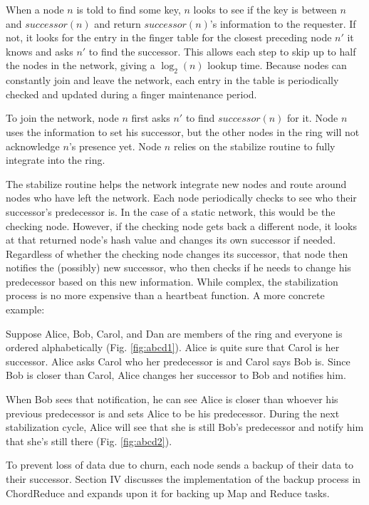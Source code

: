 When a node $n$ is told to find some key, $n$ looks to see if the key is between $n$ and $successor(n)$ and return $successor(n)$'s information to the requester. If not, it looks for the entry in the finger table for the closest preceding node $n'$ it knows and asks $n'$ to find the successor.  This allows each step to skip up to half the nodes in the network, giving a $\log_2(n)$ lookup time.  Because nodes can constantly join and leave the network, each entry in the table is periodically checked and updated during a finger maintenance period. 

To join the network, node $n$ first asks $n'$ to find $successor(n)$ for it.  Node $n$ uses the information to set his successor, but the other nodes in the ring will not acknowledge $n$'s presence yet.  Node $n$ relies on the stabilize routine to fully integrate into the ring.

The stabilize routine helps the network integrate new nodes and route around nodes who have left the network. Each node periodically checks to see who their successor's predecessor is.  In the case of a static network, this would be the checking node.  However, if the checking node gets back a different node, it looks at that returned node's hash value and changes its own successor if needed.  Regardless of whether the checking node changes its successor, that node then notifies the (possibly) new successor,  who then checks if he needs to change his predecessor based on this new information.  While complex, the stabilization process is no more expensive than a heartbeat function.  A more concrete example:


Suppose Alice, Bob, Carol, and Dan are members of the ring and everyone is ordered alphabetically (Fig. \ref{fig:abcd1}). Alice is quite sure that Carol is her successor.  Alice asks Carol who her predecessor is and Carol says Bob is.  Since Bob is closer than Carol, Alice changes her successor to Bob and notifies him.  

When Bob sees that notification, he can see Alice is closer than whoever his previous predecessor is and sets Alice to be his predecessor.  During the next stabilization cycle, Alice will see that she is still Bob's predecessor and notify him that she's still there (Fig. \ref{fig:abcd2}).

To prevent loss of data due to churn, each node sends a backup of their data to their successor.  Section IV discusses the implementation of the backup process in ChordReduce and expands upon it for backing up Map and Reduce tasks.


